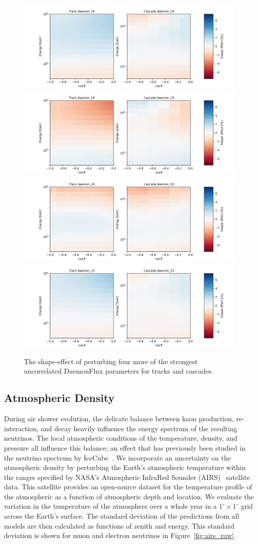 \documentclass[main.tex]{subfiles}
\begin{document}
\begin{figure}
    \centering
    \includegraphics[width=0.45\linewidth]{figures/systematics/daemon_18.png}%
    \includegraphics[width=0.45\linewidth]{figures/systematics/daemon_19.png}\\
    \includegraphics[width=0.45\linewidth]{figures/systematics/daemon_20.png}%
    \includegraphics[width=0.45\linewidth]{figures/systematics/daemon_23.png}
    \caption{The shape-effect of perturbing four more of the strongest uncorrelated DaemonFlux parameters for tracks and cascades.}\label{fig:daemon_analysis_two}
\end{figure}

\subsection{Atmospheric Density}

During air shower evolution, the delicate balance between kaon production, re-interaction, and decay heavily influence the energy spectrum of the resulting neutrinos. 
The local atmospheric conditions of the temperature, density, and pressure all influence this balance; an effect that has previously been studied in the neutrino spectrum by IceCube~\cite{heix2019seasonal,abbasi2023observation}. 
We incorporate an uncertainty on the atmospheric density by perturbing the Earth's atmospheric temperature within the ranges specified by NASA's Atmospheric InfraRed Sounder (AIRS)~\cite{airs_ref} satellite data. 
This satellite provides an open-source dataset for the temperature profile of the atmospheric as a function of atmospheric depth and location. 
We evaluate the variation in the temperature of the atmosphere over a whole year in a $1^{\circ}\times1^{\circ}$ grid across the Earth's surface. 
The standard deviation of the predictions from all models are then calculated as functions of zenith and energy. 
This standard deviation is shown for muon and electron neutrinos in Figure~\ref{fig:airs_raw}.
\end{document}
